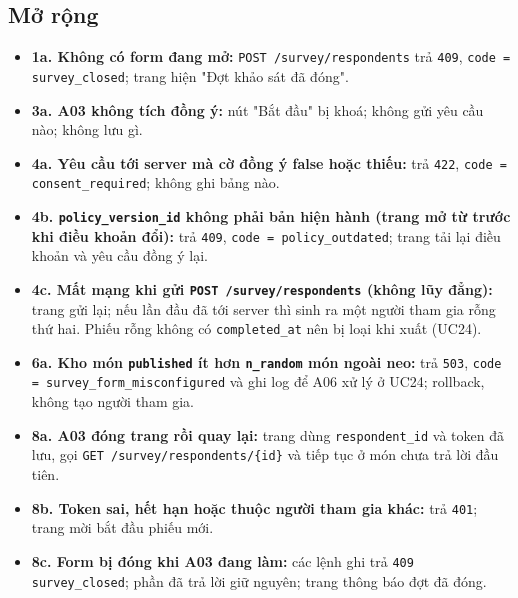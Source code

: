 \subsection{Mở rộng}
\begin{itemize}
\item \textbf{1a. Không có form đang mở:} {\small\texttt{POST /\allowbreak{}\allowbreak{}survey/\allowbreak{}\allowbreak{}respondents}} trả {\small\texttt{409}}, {\small\texttt{code = survey\_\allowbreak{}\allowbreak{}closed}}; trang hiện "Đợt khảo sát đã đóng".
\item \textbf{3a. A03 không tích đồng ý:} nút "Bắt đầu" bị khoá; không gửi yêu cầu nào; không lưu gì.
\item \textbf{4a. Yêu cầu tới server mà cờ đồng ý false hoặc thiếu:} trả {\small\texttt{422}}, {\small\texttt{code = consent\_\allowbreak{}\allowbreak{}required}}; không ghi bảng nào.
\item \textbf{4b. {\small\texttt{policy\_\allowbreak{}\allowbreak{}version\_\allowbreak{}\allowbreak{}id}} không phải bản hiện hành (trang mở từ trước khi điều khoản đổi):} trả {\small\texttt{409}}, {\small\texttt{code = policy\_\allowbreak{}\allowbreak{}outdated}}; trang tải lại điều khoản và yêu cầu đồng ý lại.
\item \textbf{4c. Mất mạng khi gửi {\small\texttt{POST /\allowbreak{}\allowbreak{}survey/\allowbreak{}\allowbreak{}respondents}} (không lũy đẳng):} trang gửi lại; nếu lần đầu đã tới server thì sinh ra một người tham gia rỗng thứ hai. Phiếu rỗng không có {\small\texttt{completed\_\allowbreak{}\allowbreak{}at}} nên bị loại khi xuất (UC24).
\item \textbf{6a. Kho món {\small\texttt{published}} ít hơn {\small\texttt{n\_\allowbreak{}\allowbreak{}random}} món ngoài neo:} trả {\small\texttt{503}}, {\small\texttt{code = survey\_\allowbreak{}\allowbreak{}form\_\allowbreak{}\allowbreak{}misconfigured}} và ghi log để A06 xử lý ở UC24; rollback, không tạo người tham gia.
\item \textbf{8a. A03 đóng trang rồi quay lại:} trang dùng {\small\texttt{respondent\_\allowbreak{}\allowbreak{}id}} và token đã lưu, gọi {\small\texttt{GET /\allowbreak{}\allowbreak{}survey/\allowbreak{}\allowbreak{}respondents/\allowbreak{}\allowbreak{}\{id\}}} và tiếp tục ở món chưa trả lời đầu tiên.
\item \textbf{8b. Token sai, hết hạn hoặc thuộc người tham gia khác:} trả {\small\texttt{401}}; trang mời bắt đầu phiếu mới.
\item \textbf{8c. Form bị đóng khi A03 đang làm:} các lệnh ghi trả {\small\texttt{409}} {\small\texttt{survey\_\allowbreak{}\allowbreak{}closed}}; phần đã trả lời giữ nguyên; trang thông báo đợt đã đóng.

\end{itemize}
